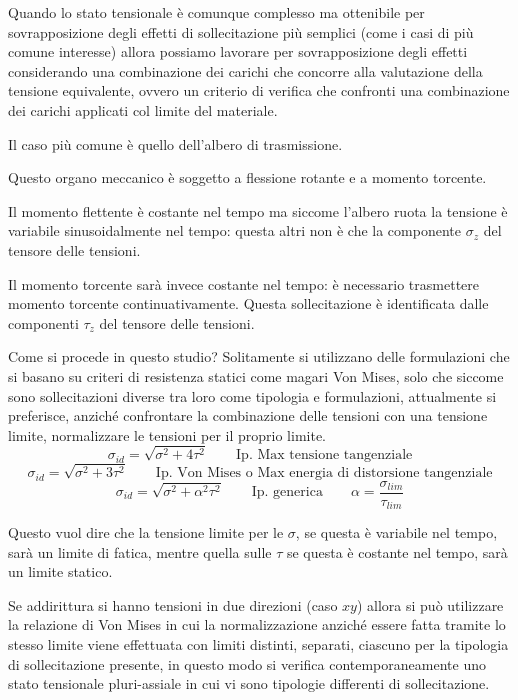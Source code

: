 \documentclass{article}
\begin{document}
\begin{adjustwidth}{2in}{}
			Quando lo stato tensionale è comunque complesso ma ottenibile per sovrapposizione degli effetti di sollecitazione più semplici (come i casi di più comune interesse) allora possiamo lavorare per sovrapposizione degli effetti considerando una combinazione dei carichi che concorre alla valutazione della tensione equivalente, ovvero un criterio di verifica che confronti una combinazione dei carichi applicati col limite del materiale. \newline
			
			Il caso più comune è quello dell'albero di trasmissione. 
			
			Questo organo meccanico è soggetto a flessione rotante e a momento torcente. 
			
			Il momento flettente è costante nel tempo ma siccome l'albero ruota la tensione è variabile sinusoidalmente nel tempo: questa altri non è che la componente $\sigma_z$ del tensore delle tensioni.
			
			Il momento torcente sarà invece costante nel tempo: è necessario trasmettere momento torcente continuativamente. Questa sollecitazione è identificata dalle componenti $\tau_z$ del tensore delle tensioni. \newline
			
			Come si procede in questo studio? Solitamente si utilizzano delle formulazioni che si basano su criteri di resistenza statici come magari Von Mises, solo che siccome sono sollecitazioni diverse tra loro come tipologia e formulazioni, attualmente si preferisce, anziché confrontare la combinazione delle tensioni con una tensione limite, normalizzare le tensioni per il proprio limite.
			\[\sigma_{id} = \sqrt{\sigma^2 + 4\tau^2} \qquad \text{Ip. Max tensione tangenziale}\]
			\[\sigma_{id} = \sqrt{\sigma^2 + 3\tau^2} \qquad \text{Ip. Von Mises o Max energia di distorsione tangenziale}\]
			\[\sigma_{id} = \sqrt{\sigma^2 + \alpha^2\tau^2} \qquad \text{Ip. generica} \qquad \alpha = \dfrac{\sigma_{lim}}{\tau_{lim}}\]

			Questo vuol dire che la tensione limite per le $\sigma$, se questa è variabile nel tempo, sarà un limite di fatica, mentre quella sulle $\tau$ se questa è costante nel tempo, sarà un limite statico.
			
			Se addirittura si hanno tensioni in due direzioni (caso $xy$) allora si può utilizzare la relazione di Von Mises in cui la normalizzazione anziché essere fatta tramite lo stesso limite viene effettuata con limiti distinti, separati, ciascuno per la tipologia di sollecitazione presente, in questo modo si verifica contemporaneamente uno stato tensionale pluri-assiale in cui vi sono tipologie differenti di sollecitazione. 
			

\end{adjustwidth}
\end{document}
